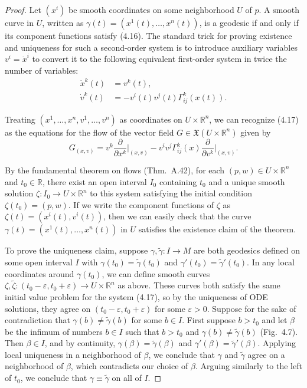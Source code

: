 \begin{proof}
Let $(x^i)$ be smooth coordinates on some neighborhood $U$ of $p$. A smooth curve in $U$, written as $\gamma(t) = (x^1(t), \ldots, x^n(t))$, is a geodesic if and only if its component functions satisfy (4.16). The standard trick for proving existence and uniqueness for such a second-order system is to introduce auxiliary variables $v^i = \dot{x}^i$ to convert it to the following equivalent first-order system in twice the number of variables:
\begin{align}
\dot{x}^k(t) &= v^k(t), \\
\dot{v}^k(t) &= -v^i(t)v^j(t)\Gamma^k_{ij}(x(t)). \tag{4.17}
\end{align}


Treating $(x^1,\ldots,x^n,v^1,\ldots,v^n)$ as coordinates on $U \times \mathbb{R}^n$, we can recognize (4.17) as the equations for the flow of the vector field $G \in \mathfrak{X}(U \times \mathbb{R}^n)$ given by
\begin{equation}
G_{(x,v)} = v^k \frac{\partial}{\partial x^k}\bigg|_{(x,v)} - v^i v^j \Gamma^k_{ij}(x) \frac{\partial}{\partial v^k}\bigg|_{(x,v)}. \tag{4.18}
\end{equation}

By the fundamental theorem on flows (Thm.~A.42), for each $(p,w) \in U \times \mathbb{R}^n$ and $t_0 \in \mathbb{R}$, there exist an open interval $I_0$ containing $t_0$ and a unique smooth solution $\zeta: I_0 \to U \times \mathbb{R}^n$ to this system satisfying the initial condition $\zeta(t_0) = (p,w)$. If we write the component functions of $\zeta$ as $\zeta(t) = (x^i(t), v^i(t))$, then we can easily check that the curve $\gamma(t) = (x^1(t),\ldots,x^n(t))$ in $U$ satisfies the existence claim of the theorem.

To prove the uniqueness claim, suppose $\gamma,\tilde{\gamma}: I \to M$ are both geodesics defined on some open interval $I$ with $\gamma(t_0) = \tilde{\gamma}(t_0)$ and $\gamma'(t_0) = \tilde{\gamma}'(t_0)$. In any local coordinates around $\gamma(t_0)$, we can define smooth curves $\zeta, \tilde{\zeta}: (t_0 - \varepsilon, t_0 + \varepsilon) \to U \times \mathbb{R}^n$ as above. These curves both satisfy the same initial value problem for the system (4.17), so by the uniqueness of ODE solutions, they agree on $(t_0 - \varepsilon,t_0 + \varepsilon)$ for some $\varepsilon > 0$. Suppose for the sake of contradiction that $\gamma(b) \neq \tilde{\gamma}(b)$ for some $b \in I$. First suppose $b > t_0$ and let $\beta$ be the infimum of numbers $b \in I$ such that $b > t_0$ and $\gamma(b) \neq \tilde{\gamma}(b)$ (Fig.~4.7). Then $\beta \in I$, and by continuity, $\gamma(\beta) = \tilde{\gamma}(\beta)$ and $\gamma'(\beta) = \tilde{\gamma}'(\beta)$. Applying local uniqueness in a neighborhood of $\beta$, we conclude that $\gamma$ and $\tilde{\gamma}$ agree on a neighborhood of $\beta$, which contradicts our choice of $\beta$. Arguing similarly to the left of $t_0$, we conclude that $\gamma \equiv \tilde{\gamma}$ on all of $I$.
\end{proof}

